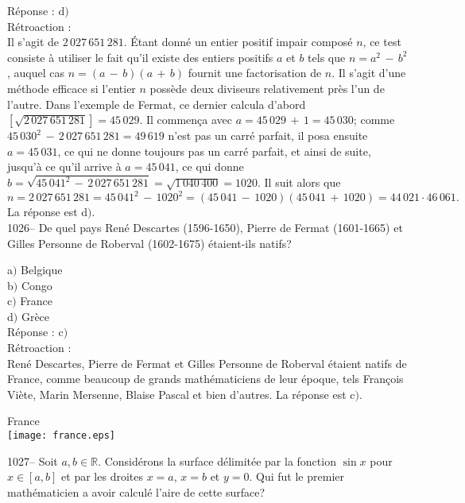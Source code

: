 ﻿\documentclass[letterpaper, 12pt]{article}
\begin{document}
R\'eponse : d$)$\\

R\'etroaction : \\
Il s'agit de $2\,027\,651\,281$. \'Etant donn\'e un entier positif
impair compos\'e $n$, ce test consiste \`a utiliser le fait qu'il
existe des entiers positifs $a$ et $b$ tels que $n=a^2\,-\,b^2$,
auquel cas $n=(a\,-\,b)(a\,+\,b)$ fournit une factorisation de $n$.
Il s'agit d'une m\'ethode efficace si l'entier $n$ poss\`ede deux
diviseurs relativement pr\`es l'un de l'autre. Dans l'exemple de
Fermat, ce dernier calcula d'abord $[\sqrt{
2\,027\,651\,281}]=45\,029$. Il commen\c ca avec
$a=45\,029\,+\,1=45\,030$; comme
$45\,030^2\,-\,2\,027\,651\,281=49\,619$ n'est pas un carr\'e
parfait, il posa ensuite $a=45\,031$, ce qui ne donne toujours pas
un carr\'e parfait, et ainsi de suite, jusqu'\`a ce qu'il arrive \`a
$a=45\,041$, ce qui donne
$b=\sqrt{45\,041^2\,-\,2\,027\,651\,281}=\sqrt{1\,040\,400}=1020$.
Il suit alors que
$$n=2\,027\,651\,281=45\,041^2\,-\,1020^2=(45\,041\,-\,1020)(45\,041\,+\,1020)=44\,021\cdot46\,061.$$
La r\'eponse est d$)$.\\

1026-- De quel pays Ren\'e Descartes (1596-1650), Pierre de Fermat
(1601-1665) et Gilles Personne de Roberval (1602-1675) \'etaient-ils
natifs?

a$)$ Belgique  \\
b$)$ Congo \\
c$)$ France  \\
d$)$ Gr\`ece\\

R\'eponse : c$)$\\

R\'etroaction :\\
Ren\'e Descartes, Pierre de Fermat et Gilles Personne de Roberval
\'etaient natifs de France, comme beaucoup de grands
math\'ematiciens de leur \'epoque, tels Fran\c cois Vi\`ete, Marin
Mersenne, Blaise Pascal et bien d'autres. La r\'eponse est c$)$.

        \begin{center}
        France\\
    \texttt{[image: france.eps]}\\
    \end{center}

1027-- Soit $a,b\in\mathbb{R}$. Consid\'erons la surface
d\'elimit\'ee par la fonction $\sin x$ pour $x\in[a,b]$ et par les
droites $x=a$, $x=b$ et $y=0$. Qui fut le premier math\'ematicien a
avoir calcul\'e l'aire de cette surface?
\end{document}
